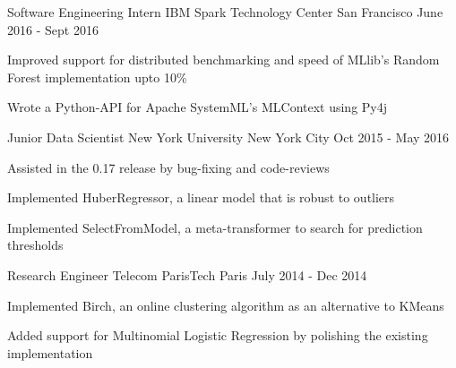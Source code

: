 \begin{cventries}
  \cventry
    {Software Engineering Intern}
    {IBM Spark Technology Center}
    {San Francisco}
    {June 2016 - Sept 2016}
    {
      \begin{cvitems}
        \item {Improved support for distributed benchmarking and speed of MLlib's Random Forest implementation upto 10\%}
        \item {Wrote a Python-API for Apache SystemML's MLContext using Py4j}
      \end{cvitems}
   }
   \cventry
    {Junior Data Scientist}
    {New York University}
    {New York City}
    {Oct 2015 - May 2016}
    {
      \begin{cvitems}
        \item {Assisted in the 0.17 release by bug-fixing and code-reviews}
        \item {Implemented HuberRegressor, a linear model that is robust to outliers}
        \item {Implemented SelectFromModel, a meta-transformer to search for prediction thresholds}
      \end{cvitems}
    }
   \cventry
    {Research Engineer}
    {Telecom ParisTech}
    {Paris}
    {July 2014 - Dec 2014}
    {
      \begin{cvitems}
        \item {Implemented Birch, an online clustering algorithm as an alternative to KMeans}
        \item {Added support for Multinomial Logistic Regression by polishing the existing implementation}
      \end{cvitems}
    }
\end{cventries}
